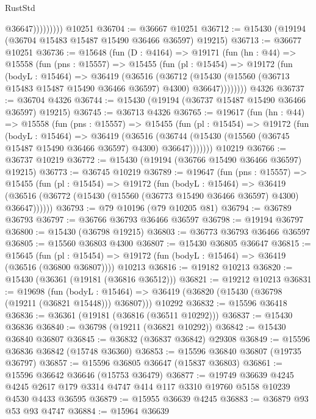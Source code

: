 \begin{lexlean}{RustStd}
\begin{coremodule}
                      @36647)))))))))
    @10251
@36704 := @36667 @10251
@36712 := @15430 (@19194 (@36704 @15483 @15487 @15490 @36466 @36597) @19215)
@36713 := @36677 @10251
@36736 := @15648
    (fun (D : @4164) =>
    @19171
      (fun (hn : @44) =>
      @15558
        (fun (pns : @15557) =>
        @15455
          (fun (pl : @15454) =>
          @19172
            (fun (bodyL : @15464) =>
            @36419
              (@36516
                (@36712
                  (@15430 (@15560 (@36713 @15483 @15487 @15490 @36466 @36597) @4300) @36647))))))))
    @4326
@36737 := @36704 @4326
@36744 := @15430 (@19194 (@36737 @15487 @15490 @36466 @36597) @19215)
@36745 := @36713 @4326
@36765 := @19617
    (fun (hn : @44) =>
    @15558
      (fun (pns : @15557) =>
      @15455
        (fun (pl : @15454) =>
        @19172
          (fun (bodyL : @15464) =>
          @36419
            (@36516
              (@36744 (@15430 (@15560 (@36745 @15487 @15490 @36466 @36597) @4300) @36647)))))))
    @10219
@36766 := @36737 @10219
@36772 := @15430 (@19194 (@36766 @15490 @36466 @36597) @19215)
@36773 := @36745 @10219
@36789 := @19647
    (fun (pns : @15557) =>
    @15455
      (fun (pl : @15454) =>
      @19172
        (fun (bodyL : @15464) =>
        @36419 (@36516 (@36772 (@15430 (@15560 (@36773 @15490 @36466 @36597) @4300) @36647))))))
@36793 := @79 @10196 (@79 @10205 @81)
@36794 := @36789 @36793
@36797 := @36766 @36793 @36466 @36597
@36798 := @19194 @36797
@36800 := @15430 (@36798 @19215)
@36803 := @36773 @36793 @36466 @36597
@36805 := @15560 @36803 @4300
@36807 := @15430 @36805 @36647
@36815 := @15645
    (fun (pl : @15454) => @19172 (fun (bodyL : @15464) => @36419 (@36516 (@36800 @36807))))
    @10213
@36816 := @19182 @10213
@36820 := @15430 (@36361 (@19181 (@36816 @36512)))
@36821 := @19212 @10213
@36831 := @19698
    (fun (bodyL : @15464) => @36419 (@36820 (@15430 (@36798 (@19211 (@36821 @15448))) @36807)))
    @10292
@36832 := @15596 @36418
@36836 := @36361 (@19181 (@36816 (@36511 @10292)))
@36837 := @15430 @36836
@36840 := @36798 (@19211 (@36821 @10292))
@36842 := @15430 @36840 @36807
@36845 := @36832 (@36837 @36842) @29308
@36849 := @15596 @36836 @36842 (@15748 @36360)
@36853 := @15596 @36840 @36807 (@19735 @36797)
@36857 := @15596 @36805 @36647 (@15837 @36803)
@36861 := @15596 @36642 @36646 (@15753 @36479)
@36877 := @19749
    @36639
    @4245
    @4245
    @2617
    @179
    @3314
    @4747
    @414
    @117
    @3310
    @19760
    @5158
    @10239
    @4530
    @4433
    @36595
@36879 := @15955 @36639 @4245
@36883 := @36879 @93 @53 @93 @4747
@36884 := @15964 @36639

\end{coremodule}
\end{lexlean}
